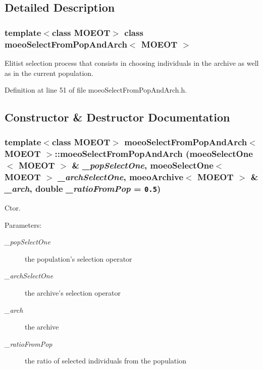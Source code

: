 \subsection{Detailed Description}
\subsubsection*{template$<$class MOEOT$>$ class moeo\-Select\-From\-Pop\-And\-Arch$<$ MOEOT $>$}

Elitist selection process that consists in choosing individuals in the archive as well as in the current population. 



Definition at line 51 of file moeo\-Select\-From\-Pop\-And\-Arch.h.

\subsection{Constructor \& Destructor Documentation}
\subsubsection{\setlength{\rightskip}{0pt plus 5cm}template$<$class MOEOT$>$ \bf{moeo\-Select\-From\-Pop\-And\-Arch}$<$ MOEOT $>$::\bf{moeo\-Select\-From\-Pop\-And\-Arch} (\bf{moeo\-Select\-One}$<$ MOEOT $>$ \& {\em \_\-pop\-Select\-One}, \bf{moeo\-Select\-One}$<$ MOEOT $>$ {\em \_\-arch\-Select\-One}, \bf{moeo\-Archive}$<$ MOEOT $>$ \& {\em \_\-arch}, double {\em \_\-ratio\-From\-Pop} = {\tt 0.5})\hspace{0.3cm}{\tt  [inline]}}\label{classmoeoSelectFromPopAndArch_96b34f67d678a7df7610f28bf10c4e86}


Ctor. 

\begin{Desc}
\item[Parameters:]
\begin{description}
\item[{\em \_\-pop\-Select\-One}]the population's selection operator \item[{\em \_\-arch\-Select\-One}]the archive's selection operator \item[{\em \_\-arch}]the archive \item[{\em \_\-ratio\-From\-Pop}]the ratio of selected individuals from the population \end{description}
\end{Desc}


